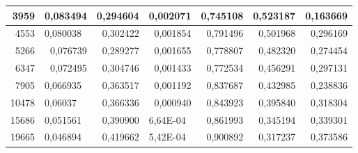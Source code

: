 \documentclass[14pt]{article}
\begin{document}
\begin{table}[H]
\begin{tabular}{|r|r|r|r|r|r|r|}
3959                    & 0,083494                      & 0,294604                  & 0,002071                      & 0,745108                  & 0,523187                    & 0,163669                    \\ \hline
4553                    & \multicolumn{1}{l|}{0,080038} & 0,302422                  & 0,001854                      & 0,791496                  & 0,501968                    & 0,296169                    \\ \hline
5266                    & 0,076739                      & 0,289277                  & 0,001655                      & 0,778807                  & 0,482320                    & 0,274454                    \\ \hline
6347                    & 0,072495                      & 0,304746                  & 0,001433                      & 0,772534                  & 0,456291                    & 0,297131                    \\ \hline
7905                    & \multicolumn{1}{l|}{0,066935} & 0,363517                  & 0,001192                      & 0,837687                  & 0,432985                    & 0,238836                    \\ \hline
10478                   & \multicolumn{1}{l|}{0,06037}  & 0,366336                  & 0,000940                      & 0,843923                  & 0,395840                    & 0,318304                    \\ \hline
15686                   & \multicolumn{1}{l|}{0,051561} & 0,390900                  & \multicolumn{1}{l|}{6,64E-04} & 0,861993                  & 0,345194                    & 0,339301                    \\ \hline
19665                   & \multicolumn{1}{l|}{0,046894} & 0,419662                  & \multicolumn{1}{l|}{5,42E-04} & 0,900892                  & 0,317237                    & 0,373586                    \\ \hline
\end{tabular}

\end{table}
\end{document}
